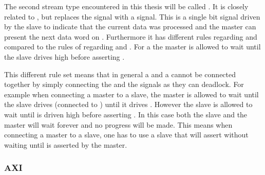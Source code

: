 The second stream type encountered in this thesis will be called \ValidNextStream{}. It is closely related to \AXIStream{}, but replaces the \TREADY{} signal with a \NEXT{} signal.
This is a single bit signal driven by the slave to indicate that the current data was processed and the master can present the next data word on \TDATA{}. Furthermore it has different rules regarding \TVALID{} and \NEXT{} compared to the rules of regarding \TVALID{} and \TREADY{}.
For a \ValidNextStream{} the master is allowed to wait until the slave drives \NEXT{} high before asserting \TVALID{}.

This different rule set means that in general a \AXIStream{} and a \ValidNextStream{} cannot be connected together by simply connecting the \TREADY{} and the \NEXT{} signals as they can deadlock. For example when connecting a \ValidNextStream{} master to a \AXIStream{} slave, the \ValidNextStream{} master is allowed to wait until the \AXIStream{} slave drives \TREADY{} (connected to \NEXT{}) until it drives \TVALID{}. However the \AXIStream{} slave is allowed to wait until \TVALID{} is driven high before asserting \TREADY{}. In this case both the slave and the master will wait forever and no progress will be made. This means when connecting a \ValidNextStream{} master to a \AXIStream{} slave, one has to use a \AXIStream{} slave that will assert \TREADY{} without waiting until \TVALID{} is asserted by the master.

\subsubsection{AXI}

